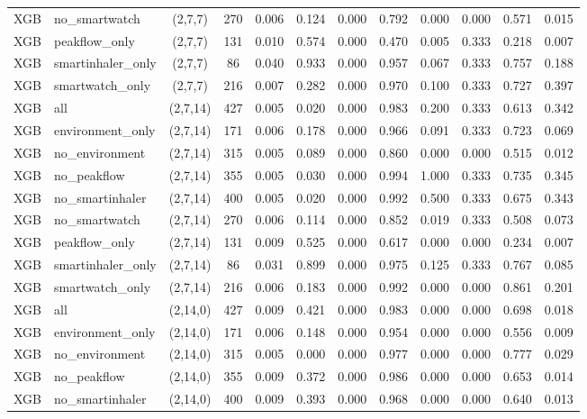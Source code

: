 \begin{longtable}{llcccccccccc}
XGB & no\_smartwatch & (2,7,7) & 270 & 0.006 & 0.124 & 0.000 & 0.792 & 0.000 & 0.000 & 0.571 & 0.015 \\
XGB & peakflow\_only & (2,7,7) & 131 & 0.010 & 0.574 & 0.000 & 0.470 & 0.005 & 0.333 & 0.218 & 0.007 \\
XGB & smartinhaler\_only & (2,7,7) & 86 & 0.040 & 0.933 & 0.000 & 0.957 & 0.067 & 0.333 & 0.757 & 0.188 \\
XGB & smartwatch\_only & (2,7,7) & 216 & 0.007 & 0.282 & 0.000 & 0.970 & 0.100 & 0.333 & 0.727 & 0.397 \\
XGB & all & (2,7,14) & 427 & 0.005 & 0.020 & 0.000 & 0.983 & 0.200 & 0.333 & 0.613 & 0.342 \\
XGB & environment\_only & (2,7,14) & 171 & 0.006 & 0.178 & 0.000 & 0.966 & 0.091 & 0.333 & 0.723 & 0.069 \\
XGB & no\_environment & (2,7,14) & 315 & 0.005 & 0.089 & 0.000 & 0.860 & 0.000 & 0.000 & 0.515 & 0.012 \\
XGB & no\_peakflow & (2,7,14) & 355 & 0.005 & 0.030 & 0.000 & 0.994 & 1.000 & 0.333 & 0.735 & 0.345 \\
XGB & no\_smartinhaler & (2,7,14) & 400 & 0.005 & 0.020 & 0.000 & 0.992 & 0.500 & 0.333 & 0.675 & 0.343 \\
XGB & no\_smartwatch & (2,7,14) & 270 & 0.006 & 0.114 & 0.000 & 0.852 & 0.019 & 0.333 & 0.508 & 0.073 \\
XGB & peakflow\_only & (2,7,14) & 131 & 0.009 & 0.525 & 0.000 & 0.617 & 0.000 & 0.000 & 0.234 & 0.007 \\
XGB & smartinhaler\_only & (2,7,14) & 86 & 0.031 & 0.899 & 0.000 & 0.975 & 0.125 & 0.333 & 0.767 & 0.085 \\
XGB & smartwatch\_only & (2,7,14) & 216 & 0.006 & 0.183 & 0.000 & 0.992 & 0.000 & 0.000 & 0.861 & 0.201 \\
XGB & all & (2,14,0) & 427 & 0.009 & 0.421 & 0.000 & 0.983 & 0.000 & 0.000 & 0.698 & 0.018 \\
XGB & environment\_only & (2,14,0) & 171 & 0.006 & 0.148 & 0.000 & 0.954 & 0.000 & 0.000 & 0.556 & 0.009 \\
XGB & no\_environment & (2,14,0) & 315 & 0.005 & 0.000 & 0.000 & 0.977 & 0.000 & 0.000 & 0.777 & 0.029 \\
XGB & no\_peakflow & (2,14,0) & 355 & 0.009 & 0.372 & 0.000 & 0.986 & 0.000 & 0.000 & 0.653 & 0.014 \\
XGB & no\_smartinhaler & (2,14,0) & 400 & 0.009 & 0.393 & 0.000 & 0.968 & 0.000 & 0.000 & 0.640 & 0.013 \\

\end{longtable}
